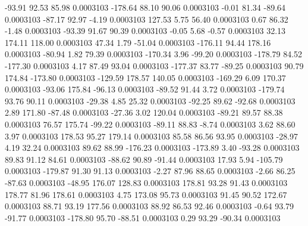       -93.91       92.53       85.98     0.0003103
     -178.64       88.10       90.06     0.0003103
       -0.01       81.34      -89.64     0.0003103
      -87.17       92.97       -4.19     0.0003103
      127.53        5.75       56.40     0.0003103
        0.67       86.32       -1.48     0.0003103
      -93.39       91.67       90.39     0.0003103
       -0.05        5.68       -0.57     0.0003103
       32.13      174.11      118.00     0.0003103
       47.34        1.79      -51.04     0.0003103
     -176.11       94.44      178.16     0.0003103
      -80.94        1.82       79.39     0.0003103
     -170.34        3.96      -99.20     0.0003103
     -178.79       84.52     -177.30     0.0003103
        4.17       87.49       93.04     0.0003103
     -177.37       83.77      -89.25     0.0003103
       90.79      174.84     -173.80     0.0003103
     -129.59      178.57      140.05     0.0003103
     -169.29        6.09      170.37     0.0003103
      -93.06      175.84      -96.13     0.0003103
      -89.52       91.44        3.72     0.0003103
     -179.74       93.76       90.11     0.0003103
      -29.38        4.85       25.32     0.0003103
      -92.25       89.62      -92.68     0.0003103
        2.89      171.80      -87.48     0.0003103
      -27.36        3.02      120.04     0.0003103
      -89.21       89.57       88.38     0.0003103
       76.57      175.74      -99.22     0.0003103
      -89.11       88.83       -8.74     0.0003103
        3.62       88.60        3.97     0.0003103
      178.53       95.27      179.14     0.0003103
       85.58       86.56       93.95     0.0003103
      -28.97        4.19       32.24     0.0003103
       89.62       88.99     -176.23     0.0003103
     -173.89        3.40      -93.28     0.0003103
       89.83       91.12       84.61     0.0003103
      -88.62       90.89      -91.44     0.0003103
       17.93        5.94     -105.79     0.0003103
     -179.87       91.30       91.13     0.0003103
       -2.27       87.96       88.65     0.0003103
       -2.66       86.25      -87.63     0.0003103
      -48.95      176.07      128.83     0.0003103
      178.81       93.28       91.43     0.0003103
      178.77       81.96      178.61     0.0003103
        4.75      173.08       95.73     0.0003103
       91.45       90.52      172.67     0.0003103
       88.71       93.19      177.56     0.0003103
       88.92       86.53       92.46     0.0003103
       -0.64       93.79      -91.77     0.0003103
     -178.80       95.70      -88.51     0.0003103
        0.29       93.29      -90.34     0.0003103

